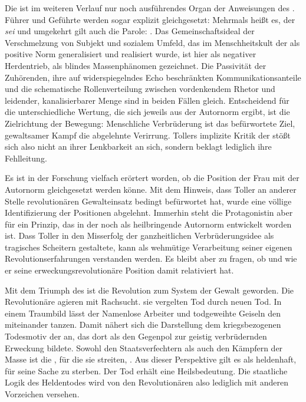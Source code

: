 Die \Cite{Masse} ist im weiteren Verlauf nur noch ausführendes Organ der
Anweisungen des \Cite{Namenlosen}. Führer und Geführte werden sogar explizit
gleichgesetzt: Mehrmals heißt es, der \Cite{Namenlose} \emph{sei} \Cite{Masse}
und umgekehrt gilt auch die Parole: \Cite{Masse ist namenlos}
.
Das Gemeinschaftsideal der Verschmelzung von Subjekt und sozialem
Umfeld, das im Menschheitskult der  als positive Norm
generalisiert und realisiert wurde, ist hier als negativer Herdentrieb, als
blindes Massenphänomen gezeichnet. 
Die Passivität der Zuhörenden, ihre auf widerspiegelndes Echo
beschränkten Kommunikationsanteile und die schematische Rollenverteilung
zwischen vordenkendem Rhetor und leidender, kanalisierbarer Menge sind in
beiden Fällen gleich. Entscheidend für die unterschiedliche Wertung, die sich
jeweils aus der Autornorm ergibt, ist die Zielrichtung der
Bewegung: Menschliche Verbrüderung ist das befürwortete Ziel, gewaltsamer
Kampf die abgelehnte Verirrung. Tollers implizite Kritik der
\Cite{Masse} stößt sich also nicht an ihrer Lenkbarkeit an sich, sondern
beklagt lediglich ihre Fehlleitung. 

Es ist in der Forschung vielfach erörtert worden, ob die Position der Frau mit
der Autornorm gleichgesetzt werden könne. Mit dem Hinweis, dass Toller
an anderer Stelle revolutionären Gewalteinsatz bedingt befürwortet hat, wurde
eine völlige Identifizierung der Positionen abgelehnt. Immerhin steht die
Protagonistin aber für ein Prinzip, das in der  noch als
heilbringende Autornorm entwickelt worden ist. 
Dass Toller in  den Misserfolg der
ganzheitlichen Verbrüderungsidee als tragisches Scheitern gestaltete, kann als
wehmütige Verarbeitung seiner eigenen Revolutionserfahrungen verstanden
werden. Es bleibt aber zu fragen, ob und wie er seine erweckungsrevolutionäre 
Position damit relativiert hat.


Mit dem Triumph des \Cite{Namenlosen} ist die Revolution zum System der Gewalt
geworden. Die Revolutionäre agieren mit Rachsucht. sie vergelten Tod durch
neuen Tod. In einem Traumbild lässt der Namenlose Arbeiter und todgeweihte
Geiseln den \Cite{Totentanz der Zeit}  miteinander
tanzen. Damit nähert sich
die Darstellung dem kriegsbezogenen Todesmotiv der  an,
das dort als \Cite{Feind des Geistes} den Gegenpol zur geistig verbrüdernden
Erweckung bildete.
Sowohl den Staatsverfechtern als auch den Kämpfern der Masse ist die
\Cite{Sache}, für die sie streiten, \Cite{heilig} . Aus dieser
Perspektive gilt es als heldenhaft, für seine Sache zu sterben. Der Tod erhält
eine Heilsbedeutung. Die staatliche Logik des
Heldentodes wird von den Revolutionären also lediglich mit anderen Vorzeichen
versehen.

